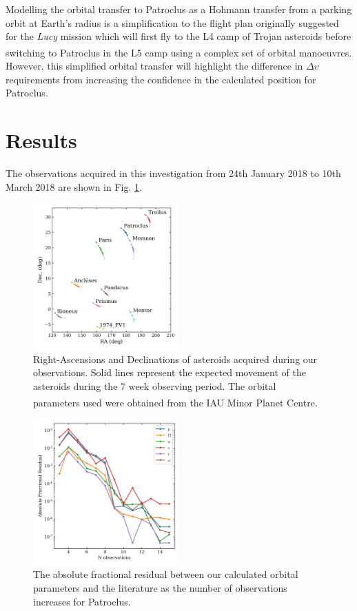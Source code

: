 \documentclass[10pt, twocolumn]{revtex4}    %
\newcommand{\scite}[1]{\textsuperscript{\cite{#1}}}
\begin{document}
Modelling the orbital transfer to Patroclus as a Hohmann transfer from a parking orbit at Earth's radius is a simplification to the flight plan originally suggested for the \textit{Lucy} mission which will first fly to the L4 camp of Trojan asteroids before switching to Patroclus in the L5 camp using a complex set of orbital manoeuvres.\scite{47thLunarPlanetary} However, this simplified orbital transfer will highlight the difference in $\Delta v$ requirements from increasing the confidence in the calculated position for Patroclus.

\section{Results} 

The observations acquired in this investigation from 24th January 2018 to 10th March 2018 are shown in Fig. \ref{fig: observations}.

\begin{figure}[h!]
\centering
\includegraphics[width=0.5\textwidth]{20180402_115205_OBSERVATIONS_MAP}
\caption{Right-Ascensions and Declinations of asteroids acquired during our observations. Solid lines represent the expected movement of the asteroids during the 7 week observing period. The orbital parameters used were obtained from the IAU Minor Planet Centre.\scite{IAUMinorPlanet}}
\label{fig: observations}
\end{figure}

\begin{figure}[h!]
\centering
\includegraphics[width=0.5\textwidth]{20180402_155517_PAT_LIT_CONVERGENCE}
\caption{The absolute fractional residual between our calculated orbital parameters and the literature as the number of observations increases for Patroclus.}
\label{fig: pat convergence}
\end{figure}
\end{document}
